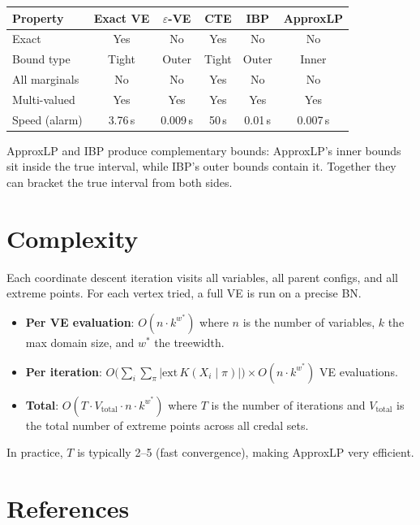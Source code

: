 \documentclass[11pt]{article}
\begin{document}
\begin{center}
\begin{tabular}{lccccc}
\toprule
\textbf{Property} & \textbf{Exact VE} & \textbf{$\varepsilon$-VE} & \textbf{CTE}
  & \textbf{IBP} & \textbf{ApproxLP} \\
\midrule
Exact & Yes & No & Yes & No & No \\
Bound type & Tight & Outer & Tight & Outer & Inner \\
All marginals & No & No & Yes & No & No \\
Multi-valued & Yes & Yes & Yes & Yes & Yes \\
Speed (alarm) & 3.76\,s & 0.009\,s & 50\,s & 0.01\,s & 0.007\,s \\
\bottomrule
\end{tabular}
\end{center}

ApproxLP and IBP produce complementary bounds: ApproxLP's inner bounds sit inside the
true interval, while IBP's outer bounds contain it. Together they can bracket the true
interval from both sides.

\section{Complexity}

Each coordinate descent iteration visits all variables, all parent configs, and all
extreme points. For each vertex tried, a full VE is run on a precise BN.

\begin{itemize}
  \item \textbf{Per VE evaluation}: $O(n \cdot k^{w^*})$ where $n$ is the number of
        variables, $k$ the max domain size, and $w^*$ the treewidth.
  \item \textbf{Per iteration}: $O\bigl(\sum_i \sum_{\pi} |\mathrm{ext}\,K(X_i \mid \pi)|\bigr)
        \times O(n \cdot k^{w^*})$ VE evaluations.
  \item \textbf{Total}: $O(T \cdot V_{\mathrm{total}} \cdot n \cdot k^{w^*})$ where $T$ is
        the number of iterations and $V_{\mathrm{total}}$ is the total number of extreme
        points across all credal sets.
\end{itemize}

In practice, $T$ is typically 2--5 (fast convergence), making ApproxLP very efficient.

\section{References}
\end{document}
